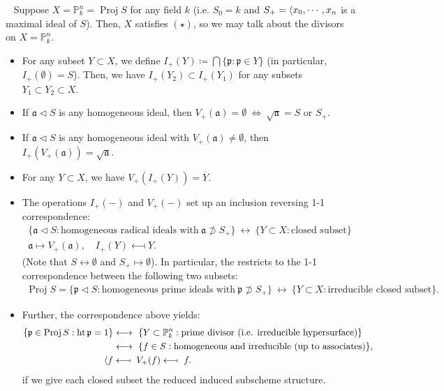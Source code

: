 \documentclass[11pt,a4paper,footinclude=true,headinclude=true]{scrbook} %
\DeclareMathOperator{\Ht}{ht}
\DeclareMathOperator{\Proj}{Proj}
\newcommand{\PP}{\mathbb{P}}
\newcommand{\pp}{\mathfrak{p}}
\newcommand{\<}{\langle}
\let\>\relax
\newcommand{\>}{\rangle}
\newenvironment{lemma}[2][]
{\renewcommand\theinnercustomlemma{#2}\innercustomlemma[#1]
\begin{mdframed}[backgroundcolor=gray!20]\ }
{\end{mdframed}\endinnercustomprop}
\begin{document}
\begin{lemma}{6.B}
    Suppose $X=\PP_k^n=\Proj S$ for any field $k$ (i.e. $S_0=k$ and $S_+=\<x_0,\cdots,x_n\>$ is a maximal ideal of $S$). Then, $X$ satisfies $(\star)$, so we may talk about the divisors on $X=\PP_k^n$.
    \begin{itemize}
        \item[(i)] For any subset $Y\subset X$, we define $I_+(Y)\coloneqq\bigcap\{\pp:\pp\in Y\}$ (in particular, $I_+(\emptyset)=S$). Then, we have $I_+(Y_2)\subset I_+(Y_1)$ for any subsets $Y_1\subset Y_2\subset X$.
        \item[(ii)] If $\mathfrak{a}\triangleleft S$ is any homogeneous ideal, then $V_+(\mathfrak{a})=\emptyset\ \Longleftrightarrow\ \sqrt{\mathfrak{a}}=S$ or $S_+$.
        \item[(iii)] If $\mathfrak{a}\triangleleft S$ is any homogeneous ideal with $V_+(\mathfrak{a})\neq\emptyset$, then $I_+(V_+(\mathfrak{a}))=\sqrt{\mathfrak{a}}$.
        \item[(iv)] For any $Y\subset X$, we have $V_+(I_+(Y))=\overline{Y}$.
        \item[(v)] The operations $I_+(-)$ and $V_+(-)$ set up an inclusion reversing 1-1 correspondence:
        \begin{gather*}
            \{\mathfrak{a}\triangleleft S:\text{homogeneous radical ideals with}\ \mathfrak{a}\not\supset S_+\}\ \longleftrightarrow\ \{Y\subset X:\text{closed subset}\}\\
            \mathfrak{a}\longmapsto V_+(\mathfrak{a}),\quad I_+(Y)\longmapsfrom Y.
        \end{gather*}
        (Note that $S\leftrightarrow\emptyset$ and $S_+\mapsto\emptyset$). In particular, the restricts to the 1-1 correspondence between the following two subsets:
        \begin{align*}
            \Proj S=\{\pp\triangleleft S:\text{homogeneous prime ideals with}\ \pp\not\supset S_+\}\ \longleftrightarrow\ \{Y\subset X:\text{irreducible closed subset}\}.
        \end{align*}
        \item[(vi)] Further, the correspondence above yields:
        \begin{align*}
            \{\pp\in\Proj S:\Ht\pp=1\} &\longleftrightarrow\ \{Y\subset\PP_k^n:\text{prime divisor (i.e. irreducible hypersurface)}\}\\
            &\longleftrightarrow\ \{f\in S:\text{homogeneous and irreducible (up to associates)}\},\\
            \<f\> &\longmapsfrom\  V_+(f)\longmapsfrom\ f.
        \end{align*}
        if we give each closed subset the reduced induced subscheme structure.
    \end{itemize}
\end{lemma}
\end{document}
